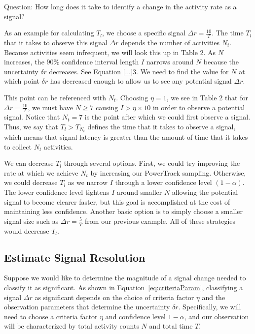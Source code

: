 \documentclass{article}
\begin{document}
Question: How long does it take to identify a change in the activity rate as a signal?

As an example for calculating $T_{l}$, we choose a specific signal $\Delta r = \frac{10}{T}$.  The time $T_{l}$ that it takes to observe this signal $\Delta r$ depends the number of activities $N_t$. Because activities seem infrequent, we will look this up in Table 2.  As $N$ increases, the $90\%$ confidence interval length $I$ narrows around $N$ because the uncertainty $\delta r$ decreases.  See Equation \ref{...}3.  We need to find the value for $N$ at which point $\delta r$ has decreased enough to allow us to see any potential signal $\Delta r$.  

This point can be referenced with $N_t$.  Choosing $\eta=1$, we see in Table 2 that for $\Delta r = \frac{10}{T}$, we must have $N\geq7$ causing $I > \eta \times 10$ in order to observe a potential signal.  Notice that $N_t=7$ is the point after which we could first observe a signal.  Thus, we say that $T_{l}>T_{N_t}$ defines the time that it takes to observe a signal, which means that signal latency is greater than the amount of time that it takes to collect $N_t$ activities.

We can decrease $T_{l}$ through several options.  First, we could try improving the rate at which we achieve $N_t$ by  increasing our PowerTrack sampling.  Otherwise, we could decrease $T_{l}$ as we narrow $I$ through a lower confidence level $(1-\alpha)$.  The lower confidence level tightens $I$ around smaller $N$ allowing the potential signal to become clearer faster, but this goal is accomplished at the cost of maintaining less confidence.  Another basic option is to simply choose a smaller signal size such as $\Delta r = \frac{5}{T}$ from our previous example.  All of these strategies would decrease $T_{l}$.

\subsection{Estimate Signal Resolution}

Suppose we would like to determine the magnitude of a signal change needed to 
classify it as significant. As shown in Equation~\ref{eq:criteriaParam}, 
classifying a signal $\Delta r$ as significant depends on the choice of criteria factor 
$\eta$ and the observation parameters that determine the uncertainty $\delta r$. 
Specifically, we will need to choose a criteria factor $\eta$ and confidence level 
$1-\alpha$, and our observation will be characterized by total activity counts $N$ 
and total time $T$.
\end{document}

